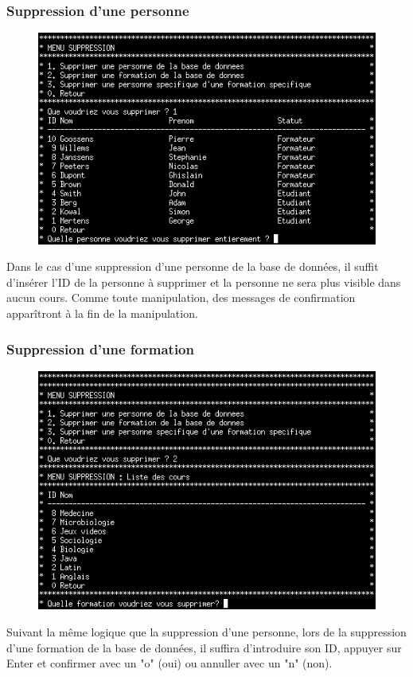 \documentclass[11pt]{article}
\begin{document}
\subsubsection{Suppression d'une personne}
\begin{figure}[ht]
  \centering
  \includegraphics[trim=0 0 0 0, clip, width=\textwidth]{images/17.png}
\end{figure}
Dans le cas d'une suppression d'une personne de la base de données, il suffit d'insérer l'ID de la personne à supprimer et la personne ne sera plus visible dans aucun cours. Comme toute manipulation, des messages de confirmation apparîtront à la fin de la manipulation.

\newpage
\subsubsection{Suppression d'une formation}
\begin{figure}[ht]
  \centering
  \includegraphics[trim=0 0 0 0, clip, width=\textwidth]{images/18.png}
\end{figure}
Suivant la même logique que la suppression d'une personne, lors de la suppression d'une formation de la base de données, il suffira d'introduire son ID, appuyer sur Enter et confirmer avec un "o" (oui) ou annuller avec un "n" (non). 
\end{document}
